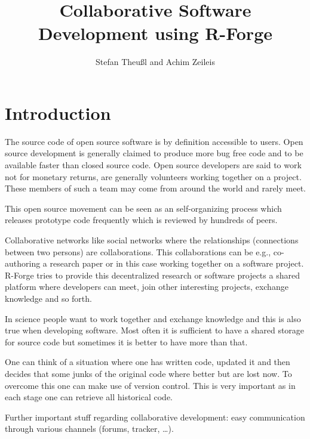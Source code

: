 \title{Collaborative Software Development using R-Forge}
\author{Stefan Theu\ss{}l and Achim Zeileis}

\maketitle

\section*{Introduction}


The source code of open source software is by definition accessible to
users. Open source development is generally claimed to produce more bug free
code and to be available faster than closed source code. Open source
developers are said to work not for monetary returns, are generally
volunteers working together on a project. These members of such a
team may come from around the world and rarely meet.

This open source
movement can
be seen as an self-organizing process which releases prototype code
frequently which is reviewed by hundreds of peers.  


Collaborative networks like social networks where the relationships
(connections between two persons) are collaborations. This
collaborations can be e.g., co-authoring a research paper or in this
case working together on a software project.
R-Forge tries to provide this decentralized research or software
projects a shared platform where developers can meet, join other
interesting projects, exchange knowledge and so forth. 

In science people want to work together and exchange knowledge and
this is also true when developing software. Most often it is
sufficient to have a shared storage for source code but sometimes it
is better to have more than that. 


One can think of a situation where one has
written code, updated it and then decides that some junks of the
original code where better but are lost now. To overcome this one can
make use of version control. This is very important as in each stage
one can retrieve all historical code.

Further important stuff regarding collaborative development: easy
communication through various channels (forums, tracker, \ldots).


